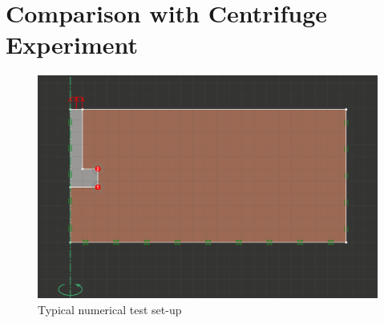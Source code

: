 \documentclass[a4paper, nobind]{templates/ociamthesis}
\begin{document}
\hypertarget{comparison-with-centrifuge-experiment}{%
\chapter{Comparison with Centrifuge Experiment}\label{comparison-with-centrifuge-experiment}}

\begin{figure}[H]
\includegraphics[width=1\linewidth]{myfigureeeeee/numericaltestsetup} \caption{Typical numerical test set-up}\label{fig:unnamed-chunk-34}
\end{figure}
\end{document}
